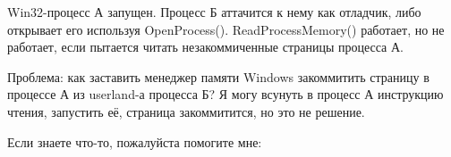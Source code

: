\myhrule{}

Win32-процесс А запущен.
Процесс Б аттачится к нему как отладчик, либо открывает его используя OpenProcess().
ReadProcessMemory() работает, но не работает, если пытается читать незакоммиченные страницы процесса А.

Проблема: как заставить менеджер памяти Windows закоммитить страницу в процессе А из userland-а процесса Б?
Я могу всунуть в процесс А инструкцию чтения, запустить её, страница закоммитится, но это не решение.

\myhrule{}

Если знаете что-то, пожалуйста помогите мне: \EMAIL{}

